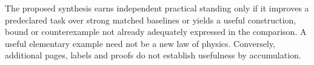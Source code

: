 The proposed synthesis earns independent practical standing only if it improves a predeclared task over strong matched baselines or yields a useful construction, bound or counterexample not already adequately expressed in the comparison. A useful elementary example need not be a new law of physics. Conversely, additional pages, labels and proofs do not establish usefulness by accumulation.
